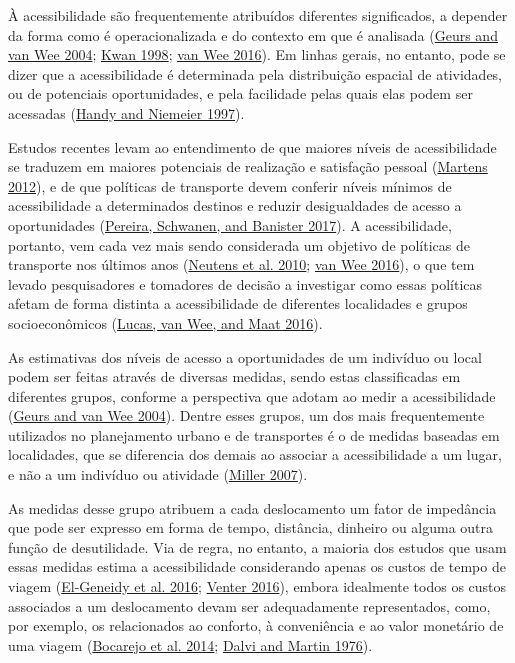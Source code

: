 \documentclass[msc,numbers]{coppe}
\begin{document}
  À acessibilidade são frequentemente atribuídos diferentes significados, a depender da forma como é operacionalizada e do contexto em que é analisada (\protect\hyperlink{ref-geurs2004accessibility}{Geurs and van Wee 2004}; \protect\hyperlink{ref-kwan1998spacetime}{Kwan 1998}; \protect\hyperlink{ref-vanwee2016accessible}{van Wee 2016}). Em linhas gerais, no entanto, pode se dizer que a acessibilidade é determinada pela distribuição espacial de atividades, ou de potenciais oportunidades, e pela facilidade pelas quais elas podem ser acessadas (\protect\hyperlink{ref-handy1997measuring}{Handy and Niemeier 1997}).

  Estudos recentes levam ao entendimento de que maiores níveis de acessibilidade se traduzem em maiores potenciais de realização e satisfação pessoal (\protect\hyperlink{ref-martens2012justice}{Martens 2012}), e de que políticas de transporte devem conferir níveis mínimos de acessibilidade a determinados destinos e reduzir desigualdades de acesso a oportunidades (\protect\hyperlink{ref-pereira2017distributive}{Pereira, Schwanen, and Banister 2017}). A acessibilidade, portanto, vem cada vez mais sendo considerada um objetivo de políticas de transporte nos últimos anos (\protect\hyperlink{ref-neutens2010equity}{Neutens et al. 2010}; \protect\hyperlink{ref-vanwee2016accessible}{van Wee 2016}), o que tem levado pesquisadores e tomadores de decisão a investigar como essas políticas afetam de forma distinta a acessibilidade de diferentes localidades e grupos socioeconômicos (\protect\hyperlink{ref-lucas2016method}{Lucas, van Wee, and Maat 2016}).

  As estimativas dos níveis de acesso a oportunidades de um indivíduo ou local podem ser feitas através de diversas medidas, sendo estas classificadas em diferentes grupos, conforme a perspectiva que adotam ao medir a acessibilidade (\protect\hyperlink{ref-geurs2004accessibility}{Geurs and van Wee 2004}). Dentre esses grupos, um dos mais frequentemente utilizados no planejamento urbano e de transportes é o de medidas baseadas em localidades, que se diferencia dos demais ao associar a acessibilidade a um lugar, e não a um indivíduo ou atividade (\protect\hyperlink{ref-miller2007placebased}{Miller 2007}).

  As medidas desse grupo atribuem a cada deslocamento um fator de impedância que pode ser expresso em forma de tempo, distância, dinheiro ou alguma outra função de desutilidade. Via de regra, no entanto, a maioria dos estudos que usam essas medidas estima a acessibilidade considerando apenas os custos de tempo de viagem (\protect\hyperlink{ref-el-geneidy2016cost}{El-Geneidy et al. 2016}; \protect\hyperlink{ref-venter2016assessing}{Venter 2016}), embora idealmente todos os custos associados a um deslocamento devam ser adequadamente representados, como, por exemplo, os relacionados ao conforto, à conveniência e ao valor monetário de uma viagem (\protect\hyperlink{ref-bocarejo2014innovative}{Bocarejo et al. 2014}; \protect\hyperlink{ref-dalvi1976measurement}{Dalvi and Martin 1976}).
\end{document}
